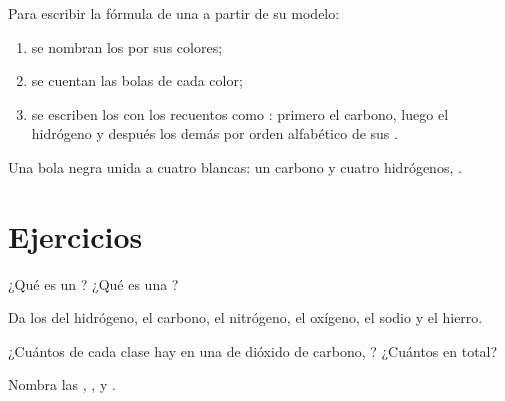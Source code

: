 \begin{method}\label{met:g7:atoms-and-molecules:model}
Para escribir la fórmula de una  a partir de su modelo:
\begin{enumerate}
  \item se nombran los  por sus colores;
  \item se cuentan las bolas de cada color;
  \item se escriben los  con los recuentos como :
        primero el carbono, luego el hidrógeno y después los demás
         por orden alfabético de sus .
\end{enumerate}
Una bola negra unida a cuatro blancas: un carbono y cuatro hidrógenos,
.
\end{method}

\section{Ejercicios}

\begin{exercise}[$\star$]\label{exo:g7:atoms-and-molecules:1}
¿Qué es un ? ¿Qué es una ?
\end{exercise}

\begin{exercise}[$\star$]\label{exo:g7:atoms-and-molecules:2}
Da los  del hidrógeno, el carbono, el nitrógeno, el oxígeno, el
sodio y el hierro.
\end{exercise}

\begin{exercise}[$\star$]\label{exo:g7:atoms-and-molecules:3}
¿Cuántos  de cada clase hay en una  de dióxido de
carbono, ? ¿Cuántos  en total?
\end{exercise}

\begin{exercise}[$\star$]\label{exo:g7:atoms-and-molecules:4}
Nombra las  , ,  y .
\end{exercise}

